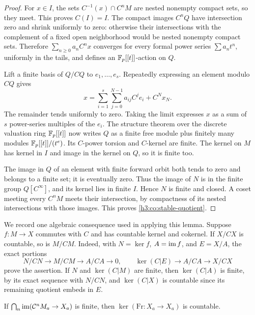 \begin{proof}
For $x\in I$, the sets $C^{-1}(x)\cap C^nM$ are nested nonempty compact
sets, so they meet.  This proves $C(I)=I$.
The compact images $C^nQ$ have intersection zero and shrink uniformly
to zero: otherwise their intersections with the complement of a fixed
open neighborhood would be nested nonempty compact sets.  Therefore
$\sum_{n\geq0}a_n C^n x$ converges for every formal power series
$\sum a_nt^n$, uniformly in the tails, and defines an
$\mathbb F_p[[t]]$-action on $Q$.

Lift a finite basis of $Q/CQ$ to $e_1,\dots,e_s$.  Repeatedly expressing
an element modulo $CQ$ gives
\[
 x=\sum_{i=1}^s\sum_{j=0}^{N-1}a_{ij}C^je_i+C^Nx_N.
\]
The remainder tends uniformly to zero.  Taking the limit expresses $x$
as a sum of $s$ power-series multiples of the $e_i$.  The structure
theorem over the discrete valuation ring $\mathbb F_p[[t]]$ now writes $Q$ as
a finite free module plus finitely many modules $\mathbb F_p[[t]]/(t^e)$.
Its $C$-power torsion and $C$-kernel are finite.  The kernel on $M$ has
kernel in $I$ and image in the kernel on $Q$, so it is finite too.

The image in $Q$ of an element with finite forward orbit both tends
to zero and belongs to a finite set; it is eventually zero.  Thus the
image of $N$ is in the finite group $Q[C^\infty]$, and its kernel lies
in finite $I$.  Hence $N$ is finite and closed.  A coset meeting every
$C^nM$ meets their intersection, by compactness of its nested
intersections with those images.  This proves
\eqref{h3:co:stable-quotient}.
\end{proof}

We record one algebraic consequence used in applying this lemma.
Suppose $f:M\to X$ commutes with $C$ and has countable kernel and
cokernel.  If $X/CX$ is countable, so is $M/CM$.  Indeed, with
$N=\ker f$, $A=\operatorname{im} f$, and $E=X/A$, the exact portions
\[
 N/CN\longrightarrow M/CM\longrightarrow A/CA\longrightarrow0,
 \qquad
 \ker(C|E)\longrightarrow A/CA\longrightarrow X/CX
\]
prove the assertion.  If $N$ and $\ker(C|M)$ are finite, then
$\ker(C|A)$ is finite, by its exact sequence with $N/CN$, and
$\ker(C|X)$ is countable since its remaining quotient embeds in $E$.

\begin{lemma}\label{h3:co:frobenius-kernel}
If $\bigcap_n\operatorname{im}(\mathcal C^nM_a\to X_a)$ is finite, then
$\ker(\mathrm{Fr}:X_a\to X_a)$ is countable.
\end{lemma}

